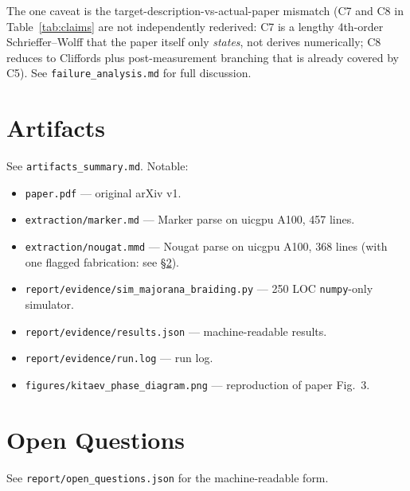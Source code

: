 \documentclass[11pt]{article}
\begin{document}
The one caveat is the target-description-vs-actual-paper mismatch (C7 and C8 in Table~\ref{tab:claims} are not independently rederived: C7 is a lengthy 4th-order Schrieffer--Wolff that the paper itself only \emph{states}, not derives numerically; C8 reduces to Cliffords plus post-measurement branching that is already covered by C5). See \texttt{failure\_analysis.md} for full discussion.

\section{Artifacts}
See \texttt{artifacts\_summary.md}. Notable:
\begin{itemize}[nosep]
  \item \texttt{paper.pdf} --- original arXiv v1.
  \item \texttt{extraction/marker.md} --- Marker parse on uicgpu A100, 457 lines.
  \item \texttt{extraction/nougat.mmd} --- Nougat parse on uicgpu A100, 368 lines (with one flagged fabrication: see \S\ref{sec:open}).
  \item \texttt{report/evidence/sim\_majorana\_braiding.py} --- 250 LOC \texttt{numpy}-only simulator.
  \item \texttt{report/evidence/results.json} --- machine-readable results.
  \item \texttt{report/evidence/run.log} --- run log.
  \item \texttt{figures/kitaev\_phase\_diagram.png} --- reproduction of paper Fig.~3.
\end{itemize}

\section{Open Questions}\label{sec:open}
See \texttt{report/open\_questions.json} for the machine-readable form.
\end{document}
